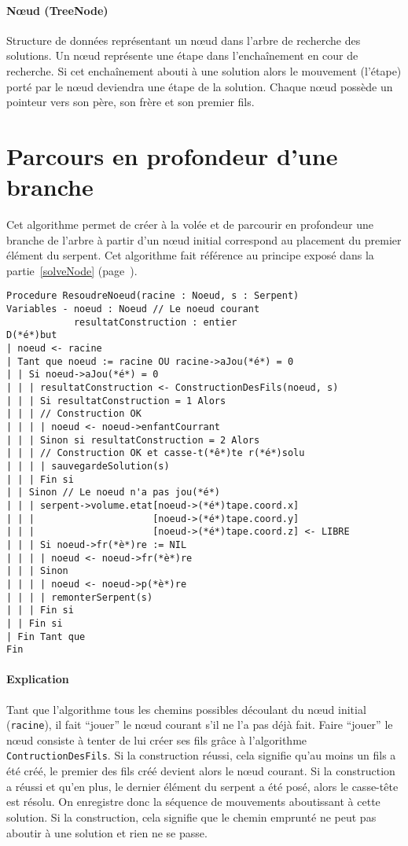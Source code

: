 \paragraph{Nœud (TreeNode)} Structure de données représentant un nœud dans l'arbre de recherche des solutions. Un nœud représente une étape dans l'enchaînement en cour de recherche. Si cet enchaînement abouti à une solution alors le mouvement (l'étape) porté par le nœud deviendra une étape de la solution.
Chaque nœud possède un pointeur vers son père, son frère et son premier fils.

\section{Parcours en profondeur d'une branche}
Cet algorithme permet de créer à la volée et de parcourir en profondeur une branche de l'arbre à partir d'un nœud initial correspond au placement du premier élément du serpent. Cet algorithme fait référence au principe exposé dans la partie~\ref{solveNode} (page~\pageref{solveNode}).

\begin{lstlisting}[caption=Algorithme de résolution pour une branche]
Procedure ResoudreNoeud(racine : Noeud, s : Serpent)
Variables - noeud : Noeud // Le noeud courant
            resultatConstruction : entier
D(*é*)but
| noeud <- racine
| Tant que noeud := racine OU racine->aJou(*é*) = 0
| | Si noeud->aJou(*é*) = 0
| | | resultatConstruction <- ConstructionDesFils(noeud, s)
| | | Si resultatConstruction = 1 Alors
| | | // Construction OK
| | | | noeud <- noeud->enfantCourrant
| | | Sinon si resultatConstruction = 2 Alors
| | | // Construction OK et casse-t(*ê*)te r(*é*)solu 
| | | | sauvegardeSolution(s)
| | | Fin si
| | Sinon // Le noeud n'a pas jou(*é*)
| | | serpent->volume.etat[noeud->(*é*)tape.coord.x]
| | |                     [noeud->(*é*)tape.coord.y]
| | |                     [noeud->(*é*)tape.coord.z] <- LIBRE
| | | Si noeud->fr(*è*)re := NIL
| | | | noeud <- noeud->fr(*è*)re
| | | Sinon
| | | | noeud <- noeud->p(*è*)re
| | | | remonterSerpent(s)
| | | Fin si
| | Fin si
| Fin Tant que
Fin
\end{lstlisting}

\newpage
\paragraph{Explication}
Tant que l'algorithme tous les chemins possibles découlant du nœud initial (\verb|racine|), il fait ``jouer'' le nœud courant s'il ne l'a pas déjà fait. Faire ``jouer'' le nœud consiste à tenter de lui créer ses fils grâce à l'algorithme \verb|ContructionDesFils|. Si la construction réussi, cela signifie qu'au moins un fils a été créé, le premier des fils créé devient alors le nœud courant. Si la construction a réussi et qu'en plus, le dernier élément du serpent a été posé, alors le casse-tête est résolu. On enregistre donc la séquence de mouvements aboutissant à cette solution. Si la construction, cela signifie que le chemin emprunté ne peut pas aboutir à une solution et rien ne se passe.

